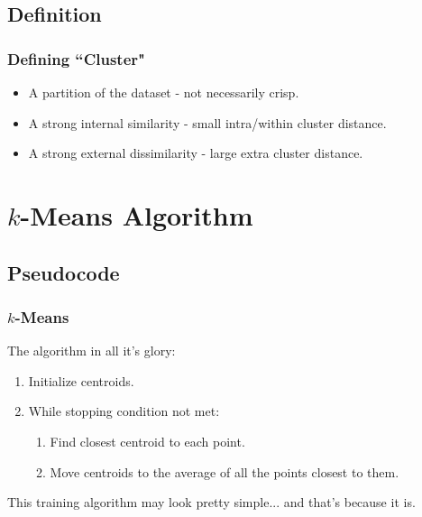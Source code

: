 \documentclass{beamer}
\begin{document}
\subsection{Definition}
\begin{frame}
  \frametitle{Defining ``Cluster"}
  \begin{itemize}
    \item A partition of the dataset - not necessarily crisp.
    \item A strong internal similarity - small intra/within cluster distance.
    \item A strong external dissimilarity - large extra cluster distance.
  \end{itemize}
\end{frame}

\section{$k$-Means Algorithm}
\subsection{Pseudocode}
\begin{frame}
  \frametitle{$k$-Means}
  The algorithm in all it's glory: \vspace{4mm}
  \begin{enumerate}
    \item Initialize centroids. \vspace{2mm}
    \item While stopping condition not met: \vspace{2mm}
    \begin{enumerate}
      \item Find closest centroid to each point. \vspace{1mm}
      \item Move centroids to the average of all the points closest to them.
    \end{enumerate}
  \end{enumerate} \vspace{4mm} \pause

  This training algorithm may look pretty simple... \pause and that's because it is.

\end{frame}
\end{document}
